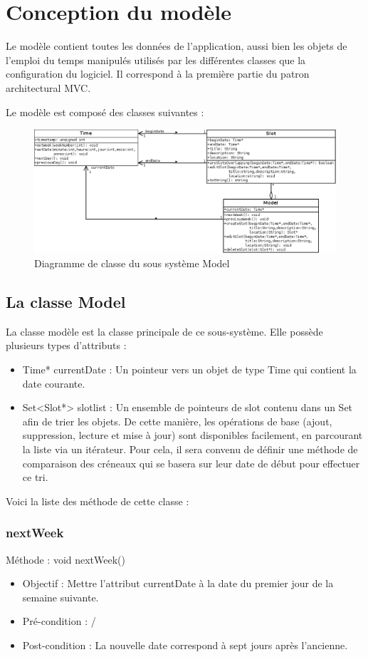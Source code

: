 \chapter{Conception du modèle}
	
	Le modèle contient toutes les données de l'application, aussi bien les objets de l'emploi du temps manipulés utilisés par les différentes classes que la configuration du logiciel. Il correspond à la première partie du patron architectural MVC. 
	
	Le modèle est composé des classes suivantes :
	\begin{figure}[!h]
		\centering
		\includegraphics[scale=0.45]{diagclasses_model.png}
		\caption{Diagramme de classe du sous système Model}
	\end{figure}
	\FloatBarrier
	
	\section{La classe Model}
		La classe modèle est la classe principale de ce sous-système. Elle possède plusieurs types d'attributs :
		\begin{itemize}
			\item Time* currentDate : Un pointeur vers un objet de type Time qui contient la date courante.
		    \item Set<Slot*> slotlist : Un ensemble de pointeurs de slot contenu dans un Set afin de trier les objets. De cette manière, les opérations de base (ajout, suppression, lecture et mise à jour) sont disponibles facilement, en parcourant la liste via un itérateur. Pour cela, il sera convenu de définir une méthode de comparaison des créneaux qui se basera sur leur date de début pour effectuer ce tri.
		\end{itemize}
	
		Voici la liste des méthode de cette classe :
		\subsection*{nextWeek}
            Méthode : void nextWeek()
			\begin{itemize}
				\item Objectif  : Mettre l'attribut currentDate à la date du premier jour de la semaine suivante.
				\item Pré-condition : /
				\item Post-condition : La nouvelle date correspond à sept jours après l'ancienne.
			\end{itemize}
			
